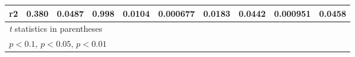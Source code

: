 {\begin{tabular}{l*{9}{c}}
\hline
r2          &       0.380         &      0.0487         &       0.998         &      0.0104         &    0.000677         &      0.0183         &      0.0442         &    0.000951         &      0.0458         \\
\hline\hline
\multicolumn{10}{l}{\footnotesize \textit{t} statistics in parentheses}\\
\multicolumn{10}{l}{\footnotesize \sym{*} \(p<0.1\), \sym{**} \(p<0.05\), \sym{***} \(p<0.01\)}\\
\end{tabular}
}
